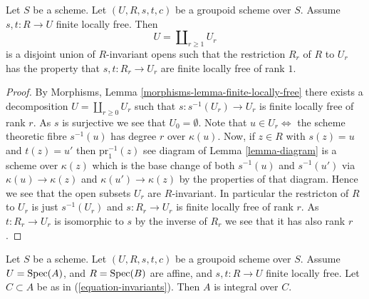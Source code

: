 \begin{lemma}
\label{lemma-finite-locally-free-disjoint-free}
Let $S$ be a scheme. Let $(U, R, s, t, c)$ be a groupoid scheme over $S$.
Assume $s, t : R \to U$ finite locally free.
Then
$$
U = \coprod\nolimits_{r \geq 1} U_r
$$
is a disjoint union of $R$-invariant opens such that the restriction $R_r$ of
$R$ to $U_r$ has the property that $s, t : R_r \to U_r$ are finite locally
free of rank $1$.
\end{lemma}

\begin{proof}
By
Morphisms, Lemma \ref{morphisms-lemma-finite-locally-free}
there exists a decomposition
$U = \coprod\nolimits_{r \geq 0} U_r$
such that $s : s^{-1}(U_r) \to U_r$ is finite locally free of rank $r$.
As $s$ is surjective we see that $U_0 = \emptyset$.
Note that $u \in U_r \Leftrightarrow$ the scheme theoretic fibre
$s^{-1}(u)$ has degree $r$ over $\kappa(u)$.
Now, if $z \in R$ with $s(z) = u$ and $t(z) = u'$
then $\text{pr}_1^{-1}(z)$ see diagram of
Lemma \ref{lemma-diagram}
is a scheme over $\kappa(z)$ which is the base change of both
$s^{-1}(u)$ and $s^{-1}(u')$ via $\kappa(u) \to \kappa(z)$
and $\kappa(u') \to \kappa(z)$ by the properties of that diagram.
Hence we see that the open subsets $U_r$ are $R$-invariant.
In particular the restricton of $R$ to $U_r$ is just
$s^{-1}(U_r)$ and $s : R_r \to U_r$ is finite locally free of rank $r$.
As $t : R_r \to U_r$ is isomorphic to $s$ by the inverse of $R_r$
we see that it has also rank $r$.
\end{proof}

\begin{lemma}
\label{lemma-integral-over-invariants}
Let $S$ be a scheme. Let $(U, R, s, t, c)$ be a groupoid scheme over $S$.
Assume $U = \mathop{\rm Spec}(A)$, and $R = \mathop{\rm Spec}(B)$ are affine, and
$s, t : R \to U$ finite locally free.
Let $C \subset A$ be as in (\ref{equation-invariants}).
Then $A$ is integral over $C$.
\end{lemma}

